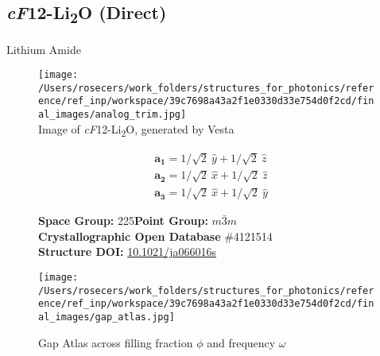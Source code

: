 \subsection{\large{\textit{cF}12-Li\textsubscript{2}O (Direct)}}\vspace{-0.1in}
Lithium Amide


\begin{figure}[H]
\begin{minipage}{0.34\textwidth}\centering
\texttt{[image: /Users/rosecers/work\_folders/structures\_for\_photonics/reference/ref\_inp/workspace/39c7698a43a2f1e0330d33e754d0f2cd/final\_images/analog\_trim.jpg]}\\
\small{Image of \textit{cF}12-Li\textsubscript{2}O, generated by Vesta}
\end{minipage}\hfill
\begin{minipage}{0.65\textwidth}\raggedright
{\setlength{\mathindent}{0cm}
\begin{equation*}
\begin{split}&\boldsymbol{a_1} = 1/\sqrt{2}\ \hat{y} + 1/\sqrt{2}\ \hat{z}\\[-8pt]
&\boldsymbol{a_2} = 1/\sqrt{2}\ \hat{x} + 1/\sqrt{2}\ \hat{z}\\[-8pt]
&\boldsymbol{a_3} = 1/\sqrt{2}\ \hat{x} + 1/\sqrt{2}\ \hat{y}
\end{split}
\end{equation*}}

\textbf{Space Group:}	225\hspace{0.5in}\textbf{Point Group:}	$m\bar{3}m$\\
\textbf{Crystallographic Open Database} \#4121514\\
\textbf{Structure DOI: }\url{10.1021/ja066016s}

\end{minipage}\hfill
\end{figure}
\vspace{-0.25in}


\begin{figure}[H]
\begin{minipage}{0.9\textwidth}\centering
\texttt{[image: /Users/rosecers/work\_folders/structures\_for\_photonics/reference/ref\_inp/workspace/39c7698a43a2f1e0330d33e754d0f2cd/final\_images/gap\_atlas.jpg]}
\\
\end{minipage}\hfill\caption{Gap Atlas across filling fraction $\phi$ and frequency $\omega$}
\end{figure}



